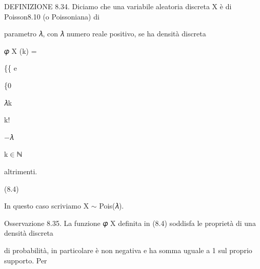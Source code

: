 \documentclass[a4paper,portrait,12pt]{article}
\begin{document}
\begin{flushleft}
DEFINIZIONE 8.34. Diciamo che una variabile aleatoria discreta X \`{e} di Poisson8.10 (o Poissoniana) di
\end{flushleft}


\begin{flushleft}
parametro 𝜆, con 𝜆 numero reale positivo, se ha densit\`{a} discreta
\end{flushleft}


\begin{flushleft}
𝜑 X (k) =
\end{flushleft}





\begin{flushleft}
\{\{ e
\end{flushleft}


\{0


\begin{flushleft}
𝜆k
\end{flushleft}


\begin{flushleft}
k!
\end{flushleft}





\begin{flushleft}
$-$𝜆
\end{flushleft}





\begin{flushleft}
k$\in$ℕ
\end{flushleft}


\begin{flushleft}
altrimenti.
\end{flushleft}





(8.4)





\begin{flushleft}
In questo caso scriviamo X $\sim$ Pois(𝜆).
\end{flushleft}


\begin{flushleft}
Osservazione 8.35. La funzione 𝜑 X definita in (8.4) soddisfa le propriet\`{a} di una densit\`{a} discreta
\end{flushleft}


\begin{flushleft}
di probabilit\`{a}, in particolare \`{e} non negativa e ha somma uguale a 1 sul proprio supporto. Per
\end{flushleft}
\end{document}
